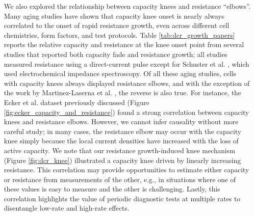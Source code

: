 \documentclass[journal=jpclcd,manuscript=article]{achemso}
\begin{document}
We also explored the relationship between capacity knees and resistance ``elbows''.
Many aging studies have shown that capacity knee onset is nearly always correlated to the onset of rapid resistance growth, even across different cell chemistries, form factors, and test protocols. Table \ref{tab:dcr_growth_papers} reports the relative capacity and resistance at the knee onset point from several studies that reported both capacity fade and resistance growth; all studies measured resistance using a direct-current pulse except for Schuster et al. \cite{schuster_nonlinear_2015}, which used electrochemical impedance spectroscopy. Of all these aging studies, cells with capacity knees always displayed resistance elbows, and with the exception of the work by Martinez-Laserna et al. \cite{martinez-laserna_technical_2018}, the reverse is also true. For instance, the Ecker et al.\cite{ecker_calendar_2014} dataset previously discussed (Figure \ref{fig:ecker_capacity_and_resistance}) found a strong correlation between capacity knees and resistance elbows.
However, we cannot infer causality without more careful study; in many cases, the resistance elbow may occur with the capacity knee simply because the local current densities have increased with the loss of active capacity.
We note that our resistance growth-induced knee mechanism (Figure \ref{fig:dcr_knee}) illustrated a capacity knee driven by linearly increasing resistance.
This correlation may provide opportunities to estimate either capacity or resistance from measurements of the other, e.g., in situations where one of these values is easy to measure and the other is challenging.
Lastly, this correlation highlights the value of periodic diagnostic tests at multiple rates to disentangle low-rate and high-rate effects.
\end{document}

